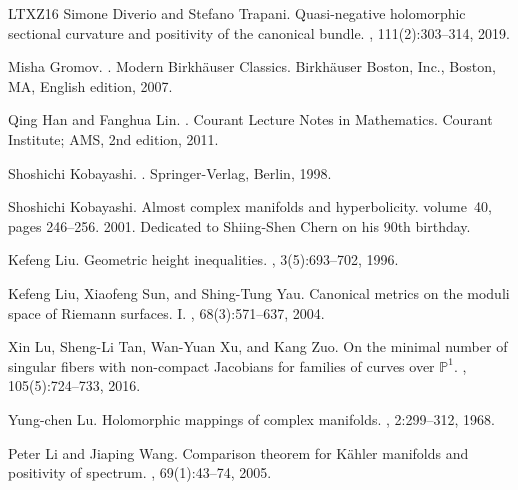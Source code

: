 \documentclass[12pt]{amsart}
\theoremstyle{plain}
\theoremstyle{definition}
\renewcommand{\>}{\rightarrow}
\numberwithin{equation}{section} %
\begin{document}
\begin{thebibliography}{LTXZ16}
	Simone Diverio and Stefano Trapani.
	\newblock Quasi-negative holomorphic sectional curvature and positivity of the canonical bundle.
	, 111(2):303--314, 2019.
	
	
	Misha Gromov.
	.
	\newblock Modern Birkh\"auser Classics. Birkh\"auser Boston, Inc., Boston, MA, English edition, 2007.
	
	
	Qing Han and Fanghua Lin.
	.
	\newblock Courant Lecture Notes in Mathematics. Courant Institute; AMS, 2nd edition, 2011.
	
	
	
	Shoshichi Kobayashi.
	.
	\newblock Springer-Verlag, Berlin, 1998.
	
	Shoshichi Kobayashi.
	\newblock Almost complex manifolds and hyperbolicity.
	\newblock volume~40, pages 246--256. 2001.
	\newblock Dedicated to Shiing-Shen Chern on his 90th birthday.
	
	
	Kefeng Liu.
	\newblock Geometric height inequalities.
	, 3(5):693--702, 1996.
	
	
	Kefeng Liu, Xiaofeng Sun, and Shing-Tung Yau.
	\newblock Canonical metrics on the moduli space of {R}iemann surfaces. {I}.
	, 68(3):571--637, 2004.
	
	Xin Lu, Sheng-Li Tan, Wan-Yuan Xu, and Kang Zuo.
	\newblock On the minimal number of singular fibers with non-compact Jacobians for families of curves over $\mathbb{P}^1$.
	, 105(5):724--733, 2016.
	
	Yung-chen Lu.
	\newblock Holomorphic mappings of complex manifolds.
	, 2:299--312, 1968.
	
	
	Peter Li and Jiaping Wang.
	\newblock Comparison theorem for {K}\"ahler manifolds and positivity of spectrum.
	, 69(1):43--74, 2005.
	

\end{thebibliography}
\end{document}
